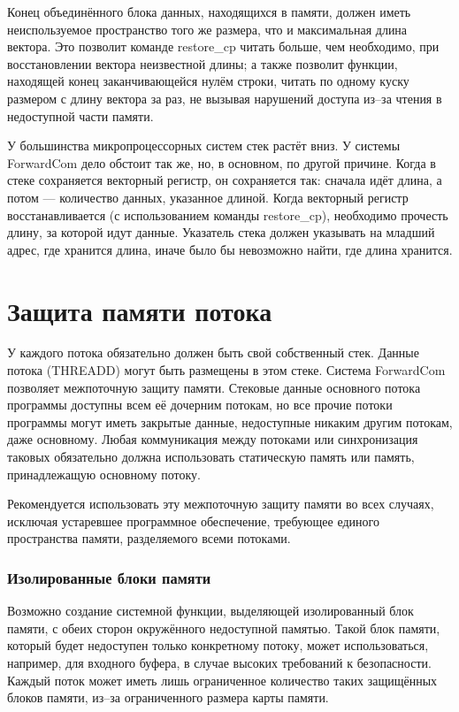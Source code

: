\documentclass[forwardcom.tex]{subfiles}
\begin{document}
Конец объединённого блока данных, находящихся в памяти, должен иметь неиспользуемое пространство того же размера, что и максимальная длина вектора. Это позволит команде restore\_cp читать больше, чем необходимо, при восстановлении вектора неизвестной длины;  а также позволит функции, находящей конец заканчивающейся нулём строки, читать по одному куску размером с длину вектора за раз, не вызывая нарушений доступа из--за чтения в недоступной части памяти.

У большинства микропроцессорных систем стек растёт вниз. У системы ForwardCom дело обстоит так же, но, в основном, по другой причине. Когда в стеке сохраняется векторный регистр, он сохраняется так: сначала идёт длина, а потом --- количество данных, указанное длиной. Когда векторный регистр восстанавливается (с использованием команды restore\_cp), необходимо прочесть  длину, за которой идут данные. Указатель стека должен указывать на младший адрес, где хранится длина, иначе было бы невозможно найти, где длина хранится.

\section{Защита памяти потока} \label{threadMemoryProtection}
У каждого потока обязательно должен быть свой собственный стек. Данные потока (THREADD) могут быть размещены в этом стеке. Система ForwardCom позволяет межпоточную защиту памяти. Стековые данные основного потока программы доступны всем её дочерним потокам, но все прочие потоки программы могут иметь закрытые данные, недоступные никаким другим потокам, даже основному. Любая коммуникация между потоками или синхронизация таковых обязательно должна использовать статическую память или память, принадлежащую основному потоку.

Рекомендуется использовать эту межпоточную защиту памяти во всех случаях, исключая устаревшее программное обеспечение, требующее единого пространства памяти, разделяемого всеми потоками.

\subsubsection{Изолированные блоки памяти} \label{isolatedMemoryBlocks}
Возможно создание системной функции, выделяющей изолированный блок памяти, с обеих сторон окружённого недоступной памятью. Такой блок памяти, который будет недоступен только конкретному потоку, может использоваться, например, для входного буфера, в случае высоких требований к безопасности. Каждый поток может иметь лишь ограниченное количество таких защищённых блоков памяти, из--за ограниченного размера карты памяти.
\end{document}
